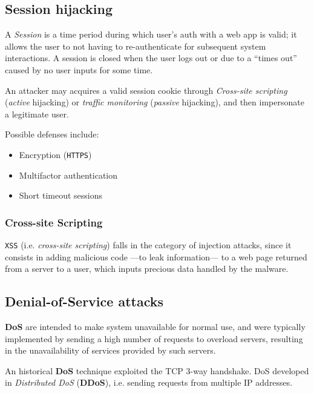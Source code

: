 
\subsection{Session hijacking}
A \textit{Session} is a time period during which user's auth with a web app is valid;
it allows the user to not having to re-authenticate for subsequent system interactions.
A session is closed when the user logs out or due to a “times out” caused by
no user inputs for some time. 

An attacker may acquires a valid session cookie through \textit{Cross-site scripting} (\textit{active} hijacking) or \textit{traffic monitoring} (\textit{passive} hijacking), and then impersonate a legitimate user.

Possible defenses include:
\begin{itemize}
   \item Encryption (\texttt{HTTPS})
   \item Multifactor authentication
   \item Short timeout sessions
\end{itemize}

\subsubsection{Cross-site Scripting}
\texttt{XSS} (i.e. \textit{cross-site scripting}) falls in the category of injection attacks,
since it consists in adding malicious code {---}to leak information{---} to a web page returned from a server to a user,
which inputs precious data handled by the malware.

\subsection{Denial-of-Service attacks}
\textbf{DoS} are intended to make system unavailable for normal use,
and were typically implemented by sending a high number of requests to overload servers,
resulting in the unavailability of services provided by such servers.

An historical \textbf{DoS} technique exploited the TCP 3-way handshake.
DoS developed in \textit{Distributed DoS} (\textbf{DDoS}),
i.e. sending requests from multiple IP addresses.

